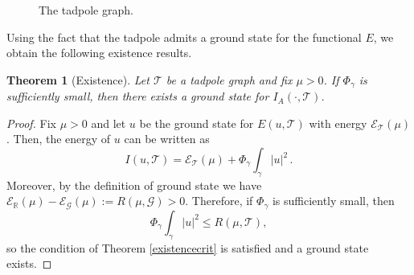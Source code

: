 \documentclass[12pt,a4paper]{amsart}
\theoremstyle{definition}
\theoremstyle{plain}
\newtheorem{theorem}[definition]{Theorem}
\def \G {\mathcal{G}}
\numberwithin{equation}{section}
\begin{document}
\begin{figure}[ht!]
 \centering
{}
        \caption{The tadpole graph.}
        \label{tadpole}
\end{figure}
\bigskip




Using the fact that the tadpole admits a ground state for the functional $E$, we obtain the following existence results.

\begin{theorem}[Existence]
\label{existence}
    Let $\mathcal T$ be a tadpole graph and fix $\mu > 0$. If $\Phi_{\gamma}$ is sufficiently small, then there exists a ground state for $I_A(\cdot, \mathcal{T})$. 
\end{theorem}

\begin{proof}
    Fix $\mu > 0$ and let $u$ be the ground state for $E(u ,\mathcal{T})$ with energy $\mathcal{E}_{\mathcal{T}}(\mu)$. Then, the energy of $u$ can be written as 
\begin{equation*}
        I(u,\mathcal T) = \mathcal{E}_{\mathcal{T}}(\mu) + \Phi_{\gamma} \int_{\gamma} |u|^2\,.
\end{equation*}
Moreover, by the definition of ground state we have $\mathcal{E}_{\mathbb{R}}(\mu)-\mathcal{E}_{\G}(\mu) := R(\mu, \G) > 0$. 
    Therefore, if $\Phi_{\gamma}$ is sufficiently small, then
    \begin{equation}
       \Phi_{\gamma} \int_{\gamma} |u|^2 \leq R(\mu, \mathcal{T}) ,
    \end{equation}
    so the condition of Theorem \ref{existencecrit} is satisfied and a ground state exists. 
\end{proof}
\end{document}
